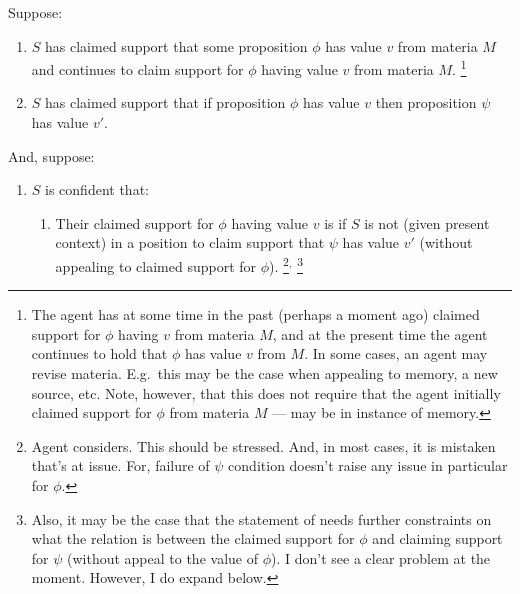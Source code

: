 \begin{note}[\nI{}]
  \begin{proposition}[\nI{-}  --- \nI{}]\label{prem:ni}
    Suppose:
    \begin{enumerate}[ref=\named{\nItext{}:\arabic*}, series=nI_counter]
    \item\label{nI:claimed-support} \(S\) has claimed support that some proposition \(\phi\) has value \(v\) from materia \(M\) and continues to claim support for \(\phi\) having value \(v\) from materia \(M\).\nolinebreak
      \footnote{
        The agent has at some time in the past (perhaps a moment ago) claimed support for \(\phi\) having \(v\) from materia \(M\), and at the present time the agent continues to hold that \(\phi\) has value \(v\) from \(M\).
        In some cases, an agent may revise materia.
        E.g.\ this may be the case when appealing to memory, a new source, etc.
        Note, however, that this does not require that the agent initially claimed support for \(\phi\) from materia \(M\) --- may be in instance of memory.
      }
    \item\label{nI:received-info} \(S\) has claimed support that if proposition \(\phi\) has value \(v\) then proposition \(\psi\) has value \(v'\).
    \end{enumerate}
    And, suppose:
    \begin{enumerate}[ref=\named{\nItext{}:\arabic*}, resume*=nI_counter]
    \item\label{nI:inclusion}
       \(S\) is confident that:
      \begin{enumerate}[label=\alph*., ref=\named{\nItext{}3:\alph*}]
      \item\label{nI:inclusion:position} Their claimed support for \(\phi\) having value \(v\) is \mom{} if \(S\) is not (given present context) in a position to claim support that \(\psi\) has value \(v'\) (without appealing to claimed support for \(\phi\)).\nolinebreak
        \footnote{
          Agent considers.
          This should be stressed.
          And, in most cases, it is mistaken that's at issue.
          For, failure of \(\psi\) condition doesn't raise any issue in particular for \(\phi\).
        }\(^{,}\)\nolinebreak
        \footnote{
          Also, it may be the case that the statement of \nI{} needs further constraints on what the relation is between the claimed support for \(\phi\) and claiming support for \(\psi\) (without appeal to the value of \(\phi\)).
          I don't see a clear problem at the moment.
          However, I do expand below.
}
\end{enumerate}
\end{enumerate}
\end{proposition}
\end{note}
